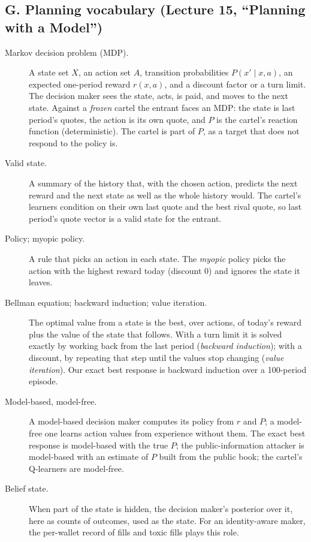 \subsection*{G. Planning vocabulary (Lecture 15, ``Planning with a Model'')}
\begin{description}
\item[Markov decision problem (MDP).] A state set $X$, an action set $A$, transition probabilities $P(x'\mid x,a)$, an expected one-period reward $r(x,a)$, and a discount factor or a turn limit. The decision maker sees the state, acts, is paid, and moves to the next state. Against a \emph{frozen} cartel the entrant faces an MDP: the state is last period's quotes, the action is its own quote, and $P$ is the cartel's reaction function (deterministic). The cartel is part of $P$, as a target that does not respond to the policy is.
\item[Valid state.] A summary of the history that, with the chosen action, predicts the next reward and the next state as well as the whole history would. The cartel's learners condition on their own last quote and the best rival quote, so last period's quote vector is a valid state for the entrant.
\item[Policy; myopic policy.] A rule that picks an action in each state. The \emph{myopic} policy picks the action with the highest reward today (discount $0$) and ignores the state it leaves.
\item[Bellman equation; backward induction; value iteration.] The optimal value from a state is the best, over actions, of today's reward plus the value of the state that follows. With a turn limit it is solved exactly by working back from the last period (\emph{backward induction}); with a discount, by repeating that step until the values stop changing (\emph{value iteration}). Our exact best response is backward induction over a 100-period episode.
\item[Model-based, model-free.] A model-based decision maker computes its policy from $r$ and $P$; a model-free one learns action values from experience without them. The exact best response is model-based with the true $P$; the public-information attacker is model-based with an estimate of $P$ built from the public book; the cartel's Q-learners are model-free.
\item[Belief state.] When part of the state is hidden, the decision maker's posterior over it, here as counts of outcomes, used as the state. For an identity-aware maker, the per-wallet record of fills and toxic fills plays this role.

\end{description}
